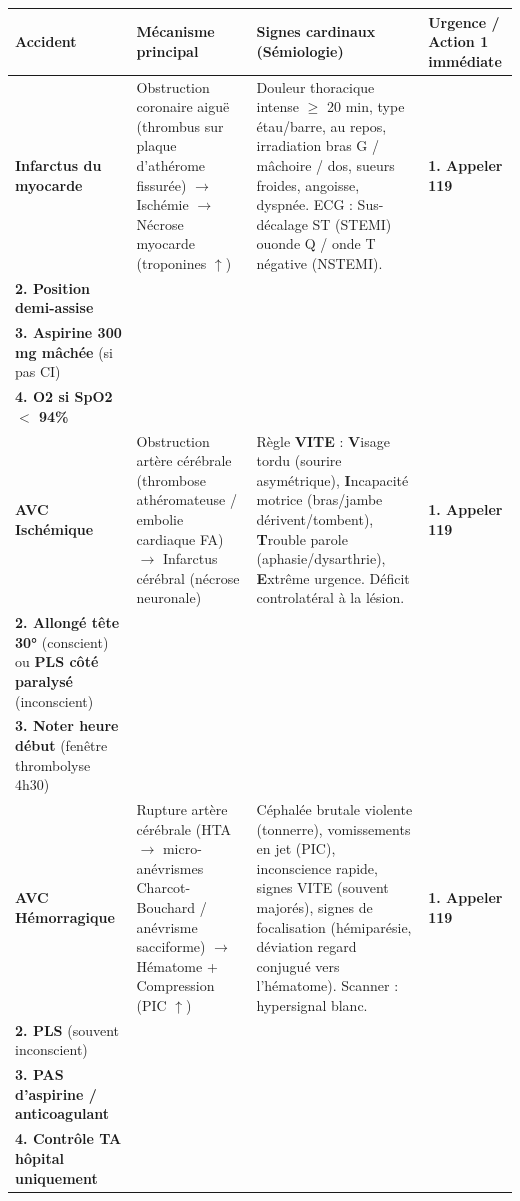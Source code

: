 \documentclass[11pt]{article}
\begin{document}
\begin{aretenir}
\begin{center}
\begin{tabularx}{\linewidth}{|l|X|X|X|}\hline
\textbf{Accident} & \textbf{Mécanisme principal} & \textbf{Signes cardinaux (Sémiologie)} & \textbf{Urgence / Action 1 immédiate} \\ \hline
\textbf{Infarctus du myocarde} & Obstruction coronaire aiguë (thrombus sur plaque d'athérome fissurée) $\rightarrow$ Ischémie $\rightarrow$ Nécrose myocarde (troponines $\uparrow$) & Douleur thoracique intense $\ge$ 20 min, type étau/barre, au repos, irradiation bras G / mâchoire / dos, sueurs froides, angoisse, dyspnée. ECG : Sus-décalage ST (STEMI) ouonde Q / onde T négative (NSTEMI). & \textbf{1. Appeler 119} \\ \textbf{2. Position demi-assise} \\ \textbf{3. Aspirine 300 mg mâchée} (si pas CI) \\ \textbf{4. O2 si SpO2 $<$ 94\%} \\ \hline
\textbf{AVC Ischémique} & Obstruction artère cérébrale (thrombose athéromateuse / embolie cardiaque FA) $\rightarrow$ Infarctus cérébral (nécrose neuronale) & Règle \textbf{VITE} : \textbf{V}isage tordu (sourire asymétrique), \textbf{I}ncapacité motrice (bras/jambe dérivent/tombent), \textbf{T}rouble parole (aphasie/dysarthrie), \textbf{E}xtrême urgence. Déficit controlatéral à la lésion. & \textbf{1. Appeler 119} \\ \textbf{2. Allongé tête 30°} (conscient) ou \textbf{PLS côté paralysé} (inconscient) \\ \textbf{3. Noter heure début} (fenêtre thrombolyse 4h30) \\ \hline
\textbf{AVC Hémorragique} & Rupture artère cérébrale (HTA $\rightarrow$ micro-anévrismes Charcot-Bouchard / anévrisme sacciforme) $\rightarrow$ Hématome + Compression (PIC $\uparrow$) & Céphalée brutale violente (tonnerre), vomissements en jet (PIC), inconscience rapide, signes VITE (souvent majorés), signes de focalisation (hémiparésie, déviation regard conjugué vers l'hématome). Scanner : hypersignal blanc. & \textbf{1. Appeler 119} \\ \textbf{2. PLS} (souvent inconscient) \\ \textbf{3. PAS d'aspirine / anticoagulant} \\ \textbf{4. Contrôle TA hôpital uniquement} \\ \hline

\end{tabularx}
\end{center}
\end{aretenir}
\end{document}
